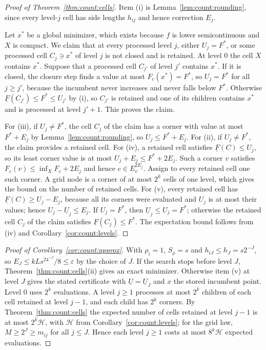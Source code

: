 \begin{proof}[Proof of Theorem~\ref{thm:count:cells}]
Item (i) is Lemma~\ref{lem:count:rounding}, since every level-$j$ cell has
side lengths $h_{ij}$ and hence correction $E_j$.

Let $x^*$ be a global minimizer, which exists because $f$ is lower
semicontinuous and $X$ is compact. We claim that at every processed level
$j$, either $U_j=F^*$, or some processed cell $C_j\ni x^*$ of level $j$ is
not closed and is retained. At level $0$ the cell $X$ contains $x^*$. Suppose
that a processed cell $C_{j'}$ of level $j'$ contains $x^*$. If it is
closed, the closure step finds a value at most $F_c(x^*)=F^*$, so
$U_{j}=F^*$ for all $j\ge j'$, because the incumbent never increases and
never falls below $F^*$. Otherwise $\underline F(C_{j'})\le F^*\le U_{j'}$ by
(i), so $C_{j'}$ is retained and one of its children contains $x^*$ and is
processed at level $j'+1$. This proves the claim.

For (iii), if $U_j\ne F^*$, the cell $C_j$ of the claim has a corner with
value at most $F^*+E_j$ by Lemma~\ref{lem:count:rounding}, so
$U_j\le F^*+E_j$. For (ii), if $U_j\ne F^*$, the claim provides a retained
cell. For (iv), a retained cell satisfies $\underline F(C)\le U_j$, so its
least corner value is at most $U_j+E_j\le F^*+2E_j$. Such a corner $v$
satisfies $F_c(v)\le\inf_XF_c+2E_j$ and hence $c\in E_v^{2E_j}$. Assign to
every retained cell one such corner. A grid node is a corner of at most
$2^k$ cells of one level, which gives the bound on the number of retained
cells. For (v), every retained cell has $\underline F(C)\ge U_j-E_j$, because
all its corners were evaluated and $U_j$ is at most their values; hence
$U_j-\underline U_j\le E_j$. If $U_j=F^*$, then $\underline U_j\le U_j=F^*$;
otherwise the retained cell $C_j$ of the claim satisfies
$\underline F(C_j)\le F^*$. The expectation
bound follows from (iv) and Corollary~\ref{cor:count:levels}.
\end{proof}

\begin{proof}[Proof of Corollary~\ref{cor:count:approx}]
With $\rho_i=1$, $S_\rho=s$ and $h_{iJ}\le h_J=s2^{-J}$, so
$E_J\le kLs^24^{-J}/8\le\varepsilon$ by the choice of $J$. If the search stops
before level $J$, Theorem~\ref{thm:count:cells}(ii) gives an exact minimizer.
Otherwise item (v) at level $J$ gives the stated certificate with
$\underline U=\underline U_J$ and $x$ the stored incumbent point. Level $0$ uses $2^k$ evaluations. A level $j\ge1$
processes at most $2^k$ children of each cell retained at level $j-1$, and
each child has $2^k$ corners. By Theorem~\ref{thm:count:cells} the expected
number of cells retained at level $j-1$ is at most $2^k\mathcal H$, with
$\mathcal H$ from Corollary~\ref{cor:count:levels}; for the grid law,
$M\ge2^J\ge m_{ij}$ for all $j\le J$. Hence each level $j\ge1$ costs at most
$8^k\mathcal H$ expected evaluations.
\end{proof}

